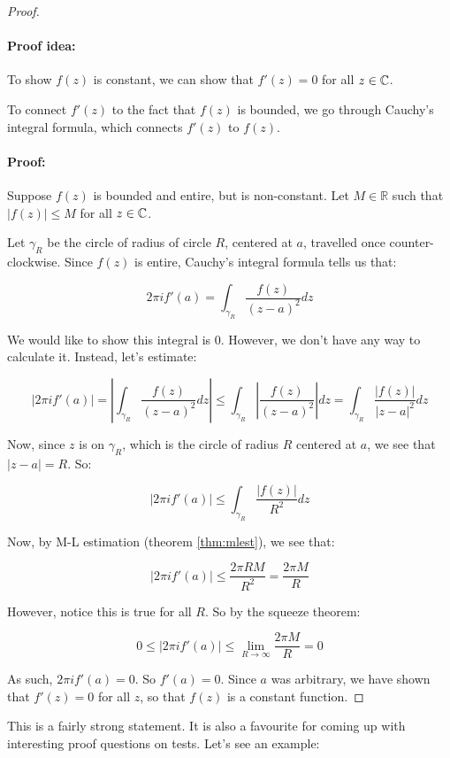 \begin{proof} ~
\paragraph{Proof idea:} To show $f(z)$ is constant, we can show that $f'(z) = 0$ for all $z \in \mathbb{C}$.

To connect $f'(z)$ to the fact that $f(z)$ is bounded, we go through Cauchy's integral formula, which connects $f'(z)$ to $f(z)$.

\paragraph{Proof:} 
Suppose $f(z)$ is bounded and entire, but is non-constant. Let $M \in \mathbb{R}$ such that $|f(z)| \le M$ for all $z\in \mathbb{C}$.

Let $\gamma_R$ be the circle of radius of circle $R$, centered at $a$, travelled once counter-clockwise. Since $f(z)$ is entire, Cauchy's integral formula tells us that:

$$2\pi i f'(a) = \int_{\gamma_R} \frac{f(z)}{(z-a)^2}dz$$

We would like to show this integral is $0$. However, we don't have any way to calculate it. Instead, let's estimate:

$$|2\pi i f'(a)| = \left| \int_{\gamma_R} \frac{f(z)}{(z-a)^2}dz\right| \le \int_{\gamma_R} \left|\frac{f(z)}{(z-a)^2}\right|dz = \int_{\gamma_R} \frac{|f(z)|}{|z-a|^2}dz$$

Now, since $z$ is on $\gamma_R$, which is the circle of radius $R$ centered at $a$, we see that $|z-a| = R$. So:

$$|2\pi i f'(a)| \le \int_{\gamma_R} \frac{|f(z)|}{R^2}dz$$

Now, by M-L estimation (theorem \ref{thm:mlest}), we see that:

$$|2\pi i f'(a)| \le \frac{2\pi RM}{R^2} = \frac{2\pi M}{R}$$


However, notice this is true for all $R$. So by the squeeze theorem:

$$0 \le |2\pi i f'(a)|\le \lim_{R\rightarrow \infty} \frac{2\pi M}{R} = 0$$

As such, $2\pi i f'(a) = 0$. So $f'(a) = 0$. Since $a$ was arbitrary, we have shown that $f'(z) = 0$ for all $z$, so that $f(z)$ is a constant function.

\end{proof}

This is a fairly strong statement. It is also a favourite for coming up with interesting proof questions on tests. Let's see an example:

